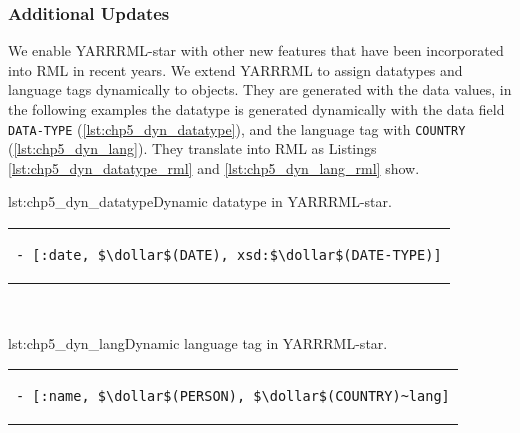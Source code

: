 \subsubsection{Additional Updates} %
We enable YARRRML-star with other new features that have been incorporated into RML in recent years. 
We extend YARRRML to assign datatypes and language tags dynamically to objects. 
They are generated with the data values, in the following examples the datatype is generated dynamically with the data field \texttt{DATA-TYPE} (\cref{lst:chp5_dyn_datatype}), and the language tag with \texttt{COUNTRY} (\cref{lst:chp5_dyn_lang}). They translate into RML as Listings \ref{lst:chp5_dyn_datatype_rml} and \ref{lst:chp5_dyn_lang_rml} show.




\begin{minipage}{0.45\linewidth}
\begin{captionedlisting}{lst:chp5_dyn_datatype}{Dynamic datatype in YARRRML-star.}
\centering
\begin{tabular}{c}
\hspace{-3em}
{
\begin{lstlisting}[basicstyle=\ttfamily\small,columns=flexible,language=yarrrmlstar]
- [:date, $\dollar$(DATE), xsd:$\dollar$(DATE-TYPE)]
\end{lstlisting}
}
\end{tabular}
\end{captionedlisting}
\end{minipage}
\,\,\,\,\hfill
\begin{minipage}{0.45\linewidth}
\begin{captionedlisting}{lst:chp5_dyn_lang}{Dynamic language tag in YARRRML-star.}
\centering
\begin{tabular}{c}
\hspace{-2.5em}
{
\begin{lstlisting}[basicstyle=\ttfamily\small,columns=flexible,language=yarrrmlstar]
- [:name, $\dollar$(PERSON), $\dollar$(COUNTRY)~lang]
\end{lstlisting}
}
\end{tabular}
\end{captionedlisting}
\end{minipage}








